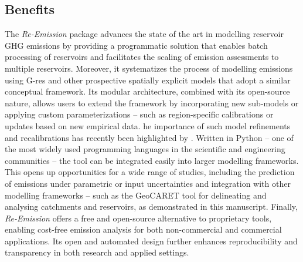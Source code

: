 \documentclass[final,1p,times]{elsarticle}
\begin{document}
\subsection{Benefits}
\label{subsec:benefits}

The \emph{Re-Emission} package advances the state of the art in modelling reservoir \ac{GHG} emissions by providing a programmatic solution that enables batch processing of reservoirs and facilitates the scaling of emission assessments to multiple reservoirs. 
Moreover, it systematizes the process of modelling emissions using G-res and other prospective spatially explicit models that adopt a similar conceptual framework.
Its modular architecture, combined with its open-source nature, allows users to extend the framework by incorporating new sub-models or applying custom parameterizations -- such as region-specific calibrations or updates based on new empirical data. 
he importance of such model refinements and recalibrations has recently been highlighted by \citet{Pilla2025}.
Written in Python -- one of the most widely used programming languages in the scientific and engineering communities -- the tool can be integrated easily into larger modelling frameworks. 
This opens up opportunities for a wide range of studies, including the prediction of emissions under parametric or input uncertainties and integration with other modelling frameworks -- such as the GeoCARET tool for delineating and analysing catchments and reservoirs, as demonstrated in this manuscript. 
Finally, \emph{Re-Emission} offers a free and open-source alternative to proprietary tools, enabling cost-free emission analysis for both non-commercial and commercial applications. 
Its open and automated design further enhances reproducibility and transparency in both research and applied settings.
\end{document}
